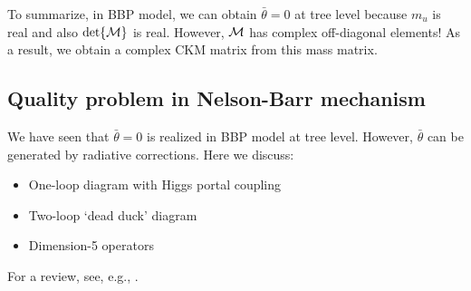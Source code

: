 \documentclass[11pt,a4paper]{article}
\begin{document}
To summarize, in BBP model, we can obtain $\bar\theta = 0$ at tree level because $m_u$ is real and also $\det{\cal M}$ is real. However, ${\cal M}$ has complex off-diagonal elements! As a result, we obtain a complex CKM matrix from this mass matrix.

\subsection{Quality problem in Nelson-Barr mechanism}
We have seen that $\bar\theta=0$ is realized in BBP model at tree level. However, $\bar\theta$ can be generated by radiative corrections. Here we discuss:
\begin{itemize}
\item One-loop diagram with Higgs portal coupling
\item Two-loop `dead duck' diagram
\item Dimension-5 operators
\end{itemize}
For a review, see, e.g., \cite{Dine:2015jga}.
\end{document}
